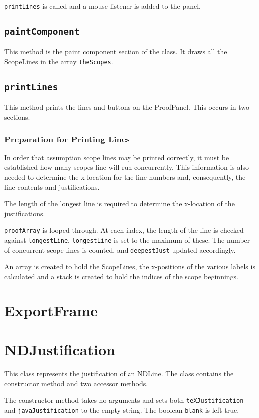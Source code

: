 \documentclass[a4paper]{article}
\begin{document}
\texttt{printLines} is called and a mouse listener is added to the panel.

\subsection{\texttt{paintComponent}}
This method is the paint component section of the class. It draws all the ScopeLines in the array \texttt{theScopes}.

\subsection{\texttt{printLines}}
This method prints the lines and buttons on the ProofPanel. This occurs in two sections.

\subsubsection{Preparation for Printing Lines}
In order that assumption scope lines may be printed correctly, it must be established how many scopes line will run concurrently. This information is also needed to determine the x-location for the line numbers and, consequently, the line contents and justifications.

The length of the longest line is required to determine the x-location of the justifications.

\texttt{proofArray} is looped through. At each index, the length of the line is checked against \texttt{longestLine}. \texttt{longestLine} is set to the maximum of these. The number of concurrent scope lines is counted, and \texttt{deepestJust} updated accordingly.

An array is created to hold the ScopeLines, the x-positions of the various labels is calculated and a stack is created to hold the indices of the scope beginnings.

\section{ExportFrame}

\section{NDJustification}
This class represents the justification of an NDLine. The class contains the constructor method and two accessor methods.

The constructor method takes no arguments and sets both \texttt{teXJustification} and \texttt{javaJustification} to the empty string. The boolean \texttt{blank} is left true.
\end{document}
